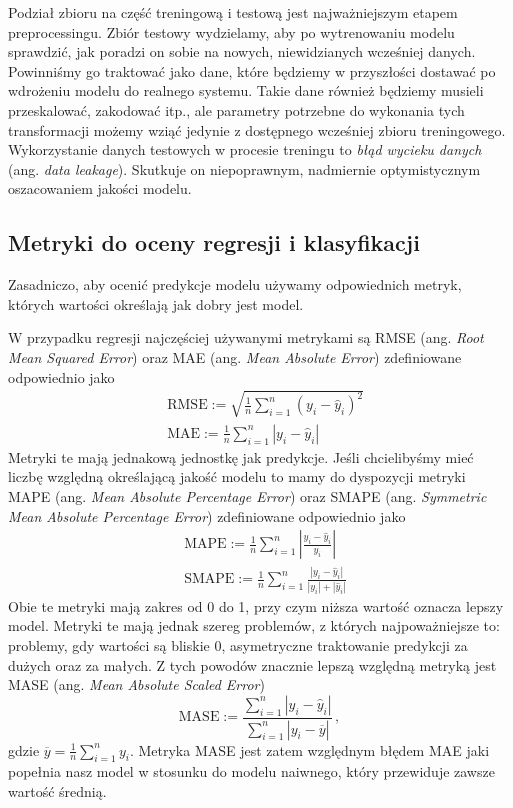 \documentclass{myclass}
\begin{document}
Podział zbioru na część treningową i testową jest najważniejszym etapem preprocessingu. Zbiór
testowy wydzielamy, aby po wytrenowaniu modelu sprawdzić, jak poradzi on sobie na nowych,
niewidzianych wcześniej danych. Powinniśmy go traktować jako dane, które będziemy w przyszłości
dostawać po wdrożeniu modelu do realnego systemu. Takie dane również będziemy musieli przeskalować,
zakodować itp., ale parametry potrzebne do wykonania tych transformacji możemy wziąć jedynie z
dostępnego wcześniej zbioru treningowego. Wykorzystanie danych testowych w procesie treningu to
\emph{błąd wycieku danych} (ang. \emph{data leakage}). Skutkuje on niepoprawnym, nadmiernie
optymistycznym oszacowaniem jakości modelu.


\subsection{Metryki do oceny regresji i klasyfikacji}

Zasadniczo, aby ocenić predykcje modelu używamy odpowiednich metryk, których wartości określają jak
dobry jest model.

W przypadku regresji najczęściej używanymi metrykami są RMSE (ang. \emph{Root Mean Squared Error})
oraz MAE (ang. \emph{Mean Absolute Error}) zdefiniowane odpowiednio jako
\[
\begin{split}
    & \mathrm{RMSE} := \sqrt{\frac{1}{n}\sum_{i=1}^n (y_i - \hat{y}_i)^2}\\
    & \mathrm{MAE} := \frac{1}{n}\sum_{i=1}^n|y_i - \hat{y}_i|
\end{split}
\]
Metryki te mają jednakową jednostkę jak predykcje. Jeśli chcielibyśmy mieć liczbę względną
określającą jakość modelu to mamy do dyspozycji metryki MAPE (ang. \emph{Mean Absolute Percentage
Error}) oraz SMAPE (ang. \emph{Symmetric Mean Absolute Percentage Error}) zdefiniowane odpowiednio
jako
\[
\begin{split}
    &\mathrm{MAPE} := \frac{1}{n}\sum_{i=1}^n\left|\frac{y_i - \hat{y}_i}{y_i}\right|\\
    &\mathrm{SMAPE} := \frac{1}{n}\sum_{i=1}^n \frac{|y_i - \hat{y}_i|}{|y_i| + |\hat{y}_i|}   
\end{split}
\]
Obie te metryki mają zakres od 0 do 1, przy czym niższa wartość oznacza lepszy model. Metryki te
mają jednak szereg problemów, z których najpoważniejsze to: problemy, gdy wartości są bliskie 0,
asymetryczne traktowanie predykcji za dużych oraz za małych. Z tych powodów znacznie lepszą względną
metryką jest MASE (ang. \emph{Mean Absolute Scaled Error})
\[
\mathrm{MASE} := \frac{\sum_{i=1}^n |y_i - \hat{y}_i|}{\sum_{i=1}^n |y_i - \overline{y}|}\,,
\]
gdzie \(\overline{y} = \frac{1}{n}\sum_{i=1}^n y_i\). Metryka MASE jest zatem względnym błędem MAE
jaki popełnia nasz model w stosunku do modelu naiwnego, który przewiduje zawsze wartość średnią.
\end{document}
